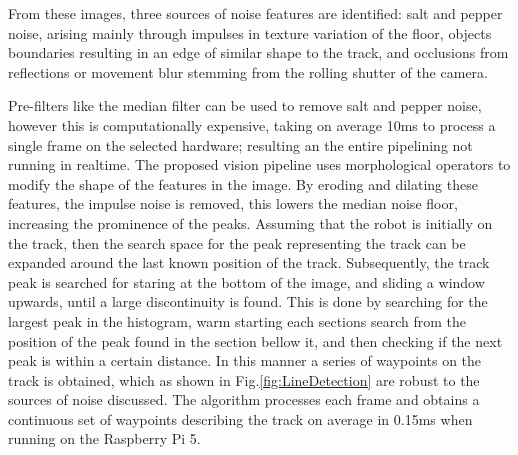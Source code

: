         From these images, three sources of noise features are identified: salt and pepper noise, arising mainly through impulses in texture 
        variation of the floor, objects boundaries resulting in an edge of similar shape to the track, and occlusions from reflections 
        or movement blur stemming from the rolling shutter of the camera.

        Pre-filters like the median filter can be used to remove salt and pepper noise, however this is computationally expensive, taking on average 10ms
        to process a single frame on the selected hardware; resulting an the entire pipelining not running in realtime. 
        The proposed vision pipeline uses morphological operators to modify the shape of the features in the image.
        By eroding and dilating these features, the impulse noise is removed, this lowers the median noise floor, increasing the prominence of the peaks. 
        Assuming that the robot is initially on the track, then the search space for the peak representing the track can be expanded around the last
        known position of the track. Subsequently, the track peak is searched for staring at the bottom of the image, and sliding a window upwards, 
        until a large discontinuity is found. This is done by searching for the largest peak in the histogram, warm starting each sections search from the position 
        of the peak found in the section bellow it, and then checking if the next peak is within a certain distance. In this manner
        a series of waypoints on the track is obtained, which as shown in Fig.\ref{fig:LineDetection} are robust to the sources of noise discussed. 
        The algorithm processes each frame and obtains a continuous set of waypoints describing the track on average in 0.15ms when running on the Raspberry Pi 5.

